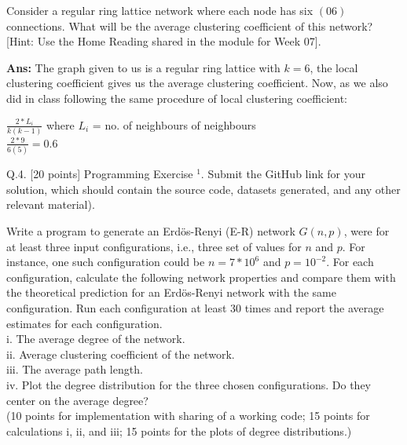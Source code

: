 \documentclass[answers]{exam}
\begin{document}
\begin{questions}
\begin{framed}
\end{framed}

    \question [10 points] Consider a regular ring lattice network where each node has six $(06)$ connections. What will be the average clustering coefficient of this network? [Hint: Use the Home Reading shared in the module for Week 07].
    
\begin{framed}
\textbf{Ans:} The graph given to us is a regular ring lattice with $k=6$, the local clustering coefficient gives us the average clustering coefficient. Now, as we also did in class following the same procedure of local clustering coefficient:
\begin{center}
    $\frac{2 * L_i}{k(k-1)}$ where $L_i$ = no. of neighbours of neighbours\\
    $\frac{2*9}{6(5)} = 0.6$
\end{center}





\end{framed}

\question Q.4. [20 points] Programming Exercise $^{1}$. Submit the GitHub link for your solution, which should contain the source code, datasets generated, and any other relevant material).

Write a program to generate an Erdös-Renyi (E-R) network $G(n, p)$, were for at least three input configurations, i.e., three set of values for $n$ and $p$. For instance, one such configuration could be $n=7 * 10^{6}$ and $p=10^{-2}$. For each configuration, calculate the following network properties and compare them with the theoretical prediction for an Erdös-Renyi network with the same configuration. Run each configuration at least 30 times and report the average estimates for each configuration.\\
i. The average degree of the network.\\
ii. Average clustering coefficient of the network.\\
iii. The average path length.\\
iv. Plot the degree distribution for the three chosen configurations. Do they center on the average degree?\\

(10 points for implementation with sharing of a working code; 15 points for calculations i, ii, and iii; 15 points for the plots of degree distributions.)

\begin{framed}


\end{framed}
\end{questions}
\end{document}
